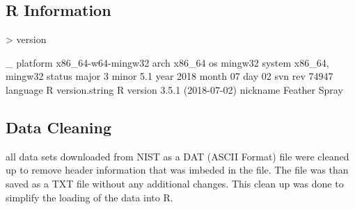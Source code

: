 \documentclass[10pt]{article}
\begin{document}
\subsection{R Information}
\begin{Schunk}
\begin{Sinput}
> version
\end{Sinput}
\begin{Soutput}
               _                           
platform       x86_64-w64-mingw32          
arch           x86_64                      
os             mingw32                     
system         x86_64, mingw32             
status                                     
major          3                           
minor          5.1                         
year           2018                        
month          07                          
day            02                          
svn rev        74947                       
language       R                           
version.string R version 3.5.1 (2018-07-02)
nickname       Feather Spray               
\end{Soutput}
\end{Schunk}

\subsection{Data Cleaning}
all data sets downloaded from NIST as a DAT (ASCII Format) file were cleaned up 
to remove header information that was imbeded in the file. The file was than saved
as a TXT file without any additional changes. This clean up was done to simplify 
the loading of the data into R.
\end{document}
